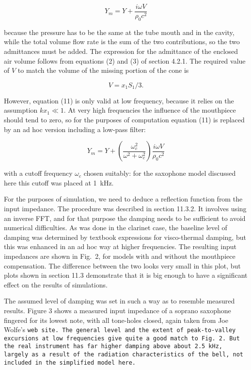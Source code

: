   $$Y_m=Y+\dfrac{i \omega V}{\rho_0 c^2} \tag{11}$$ 

  because the pressure has to be the same at the tube mouth and in the cavity, 
  while the total volume flow rate is the sum of the two contributions, so the 
  two admittances must be added. The expression for the admittance of the 
  enclosed air volume follows from equations (2) and (3) of section 4.2.1. The 
  required value of $V$ to match the volume of the missing portion of the cone 
  is 

  $$V=x_1 S_1/3 . \tag{12}$$ 

  However, equation (11) is only valid at low frequency, because it relies on 
  the assumption $kx_1 \ll 1$. At very high frequencies the influence of the 
  mouthpiece should tend to zero, so for the purposes of computation equation 
  (11) is replaced by an ad hoc version including a low-pass filter: 

  $$Y_m=Y+\left( \dfrac{\omega_c^2}{\omega^2+\omega_c^2} \right) \dfrac{i 
  \omega V}{\rho_0 c^2} \tag{13}$$ 

  with a cutoff frequency $\omega_c$ chosen suitably: for the saxophone model 
  discussed here this cutoff was placed at 1~kHz. 

  For the purposes of simulation, we need to deduce a reflection function from 
  the input impedance. The procedure was described in section 11.3.2. It 
  involves using an inverse FFT, and for that purpose the damping needs to be 
  sufficient to avoid numerical difficulties. As was done in the clarinet case, 
  the baseline level of damping was determined by textbook expressions for 
  visco-thermal damping, but this was enhanced in an ad hoc way at higher 
  frequencies. The resulting input impedances are shown in Fig.\ 2, for models 
  with and without the mouthpiece compensation. The difference between the two 
  looks very small in this plot, but plots shown in section 11.3 demonstrate 
  that it is big enough to have a significant effect on the results of 
  simulations. 


  The assumed level of damping was set in such a way as to resemble measured 
  results. Figure 3 shows a measured input impedance of a soprano saxophone 
  fingered for its lowest note, with all tone-holes closed, again taken from 
  Joe Wolfe’s \tt{}web site\rm{}. The general level and the extent of 
  peak-to-valley excursions at low frequencies give quite a good match to Fig.\ 
  2. But the real instrument has far higher damping above about 2.5~kHz, 
  largely as a result of the radiation characteristics of the bell, not 
  included in the simplified model here. 

